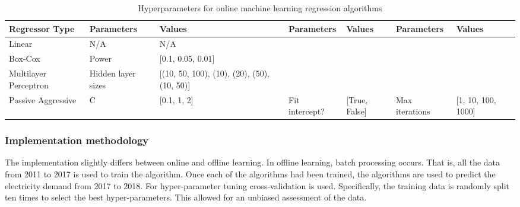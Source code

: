 \documentclass[final,3p,times,twocolumn,numbers]{elsarticle}
\begin{document}
\begin{table}

\qquad
\qquad
\qquad
\qquad
\qquad
\qquad
\qquad
\qquad
\qquad

\centering
\begin{tabular}{@{}llp{2.5cm}lllp{1.6cm}@{}}
\toprule
\textbf{Regressor Type} & \textbf{Parameters} & \textbf{Values}                                  & \textbf{Parameters} & \textbf{Values}   & \textbf{Parameters} & \textbf{Values}        \\ \midrule
Linear                  & N/A                 & N/A                                              &                     &                   &                     &                        \\
Box-Cox                 & Power               & {[}0.1, 0.05, 0.01{]}                            &                     &                   &                     &                        \\
Multilayer Perceptron   & Hidden layer sizes  & {[}(10, 50, 100), (10),  (20), (50), (10, 50){]} & 
                    &                   &                     &                        \\ 
                    Passive Aggressive      & C                   & {[}0.1, 1, 2{]}                                  & Fit intercept?      & {[}True, False{]} & Max iterations      & {[}1, 10, 100, 1000{]} \\
\bottomrule
\end{tabular}%
\caption{Hyperparameters for online machine learning regression algorithms}
\label{table:hyperparameter-tuning-online}
\end{table}%

\subsubsection{Implementation methodology}

The implementation slightly differs between online and offline learning. In offline learning, batch processing occurs. That is, all the data from 2011 to 2017 is used to train the algorithm. Once each of the algorithms had been trained, the algorithms are used to predict the electricity demand from 2017 to 2018. For hyper-parameter tuning cross-validation is used. Specifically, the training data is randomly split ten times to select the best hyper-parameters. This allowed for an unbiased assessment of the data.  
\end{document}
